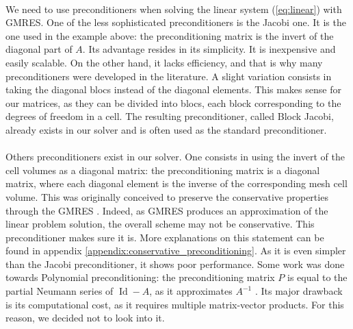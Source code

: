       \paragraph{}
      We need to use preconditioners when solving the linear system (\ref{eq:linear}) with GMRES.
      One of the less sophisticated preconditioners is the Jacobi one.
      It is the one used in the example above: the preconditioning matrix is the invert of the diagonal part of $A$.
      Its advantage resides in its simplicity.
      It is inexpensive and easily scalable.
      On the other hand, it lacks efficiency, and that is why many preconditioners were developed in the literature.
      A slight variation consists in taking the diagonal blocs instead of the diagonal elements.
      This makes sense for our matrices, as they can be divided into blocs, each block corresponding to the degrees of freedom in a cell.
      The resulting preconditioner, called Block Jacobi, already exists in our solver and is often used as the standard preconditioner.

      \paragraph{}
      Others preconditioners exist in our solver.
      One consists in using the invert of the cell volumes as a diagonal matrix: the preconditioning matrix is a diagonal matrix, where each diagonal element is the inverse of the corresponding mesh cell volume.
      This was originally conceived to preserve the conservative properties through the GMRES .
      Indeed, as GMRES produces an approximation of the linear problem solution, the overall scheme may not be conservative.
      This preconditioner makes sure it is.
      More explanations on this statement can be found in appendix \ref{appendix:conservative_preconditioning}.
      As it is even simpler than the Jacobi preconditioner, it shows poor performance.
      Some work was done towards Polynomial preconditioning: the preconditioning matrix $P$ is equal to the partial Neumann series of $\operatorname{Id} - A$, as it approximates $A^{-1}$ \cite{DuboisGreenbaumRodrigue1979}.
      Its major drawback is its computational cost, as it requires multiple matrix-vector products.
      For this reason, we decided not to look into it.

